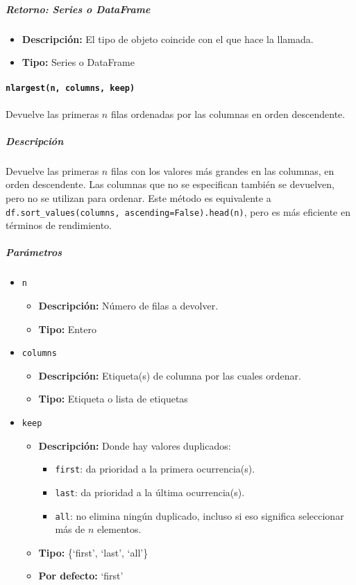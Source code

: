 \subparagraph{\textbf{Retorno:} Series o DataFrame}
\begin{itemize}
    \item \textbf{Descripción:} El tipo de objeto coincide con el que hace la
          llamada.
    \item \textbf{Tipo:} Series o DataFrame
\end{itemize}

\paragraph{\texttt{nlargest(n, columns, keep)}} Devuelve las primeras \( n \)
filas ordenadas por las columnas en orden descendente.

\subparagraph{\textbf{Descripción}} Devuelve las primeras \( n \) filas con los
valores más grandes en las columnas, en orden descendente. Las columnas que no
se especifican también se devuelven, pero no se utilizan para ordenar. Este
método es equivalente a \texttt{df.sort\_values(columns,
    ascending=False).head(n)}, pero es más eficiente en términos de rendimiento.

\subparagraph{\textbf{Parámetros}}
\begin{itemize}
    \item \texttt{n}
          \begin{itemize}
              \item \textbf{Descripción:} Número de filas a devolver.
              \item \textbf{Tipo:} Entero
          \end{itemize}
    \item \texttt{columns}
          \begin{itemize}
              \item \textbf{Descripción:} Etiqueta(s) de columna por las cuales
                    ordenar.
              \item \textbf{Tipo:} Etiqueta o lista de etiquetas
          \end{itemize}
    \item \texttt{keep}
          \begin{itemize}
              \item \textbf{Descripción:} Donde hay valores duplicados:
                    \begin{itemize}
                        \item \texttt{first}: da prioridad a la primera
                              ocurrencia(s).
                        \item \texttt{last}: da prioridad a la última
                              ocurrencia(s).
                        \item \texttt{all}: no elimina ningún duplicado,
                              incluso si eso significa seleccionar más de \( n \) elementos.
                    \end{itemize}
              \item \textbf{Tipo:} \{`first', `last', `all'\}
              \item \textbf{Por defecto:} `first'
          \end{itemize}
\end{itemize}

